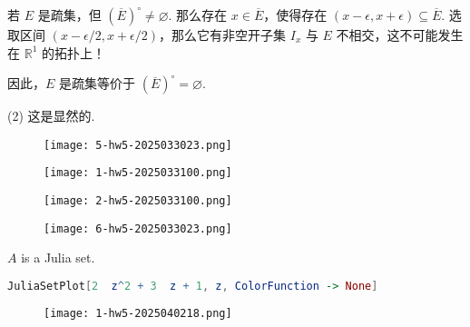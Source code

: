 若 $E$ 是疏集，但 $(\overline{E})^{\circ}\neq\varnothing$. 那么存在 $x\in \overline{E}$，使得存在 $(x-\epsilon,x+\epsilon)\subseteq \overline{E}$. 选取区间 $(x-\epsilon/2,x+\epsilon/2)$，那么它有非空开子集 $I_{x}$ 与 $E$ 不相交，这不可能发生在 $\mathbb{R}^{1}$ 的拓扑上！

因此，$E$ 是疏集等价于 $(\overline{E})^{\circ}=\varnothing$.

(2) 这是显然的.

\begin{figure}[H]
\centering
\texttt{[image: 5-hw5-2025033023.png]}
\label{}
\end{figure}

\begin{figure}[H]
\centering
\texttt{[image: 1-hw5-2025033100.png]}
\label{}
\end{figure}
\begin{figure}[H]
\centering
\texttt{[image: 2-hw5-2025033100.png]}
\label{}
\end{figure}

\begin{figure}[H]
\centering
\texttt{[image: 6-hw5-2025033023.png]}
\label{}
\end{figure}

$A$ is a Julia set.

\begin{lstlisting}[language=mathematica]
JuliaSetPlot[2  z^2 + 3  z + 1, z, ColorFunction -> None]
\end{lstlisting}
\begin{figure}[H]
\centering
\texttt{[image: 1-hw5-2025040218.png]}
\label{}
\end{figure}
